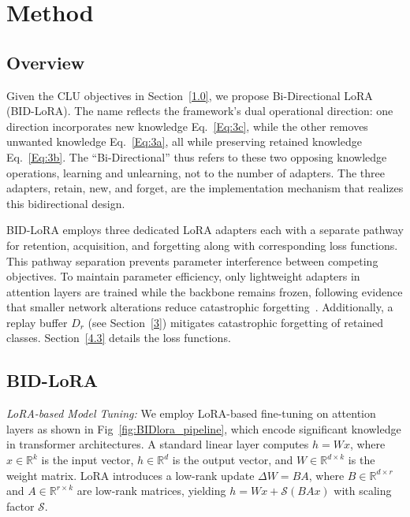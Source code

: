 \section{Method}
\label{4}
\subsection{Overview}
\label{4.1}

Given the CLU objectives in Section~\ref{1.0}, we propose Bi-Directional LoRA (BID-LoRA). The name reflects the framework's dual operational direction: one direction incorporates new knowledge Eq.~\ref{Eq:3c}, while the other removes unwanted knowledge Eq.~\ref{Eq:3a}, all while preserving retained knowledge Eq.~\ref{Eq:3b}. The ``Bi-Directional'' thus refers to these two opposing knowledge operations, learning and unlearning, not to the number of adapters. The three adapters, retain, new, and forget, are the implementation mechanism that realizes this bidirectional design.

BID-LoRA employs three dedicated LoRA adapters each with a separate pathway for retention, acquisition, and forgetting along with corresponding loss functions. This pathway separation prevents parameter interference between competing objectives. To maintain parameter efficiency, only lightweight adapters in attention layers are trained while the backbone remains frozen, following evidence that smaller network alterations reduce catastrophic forgetting~\cite{zhao2024continual}. Additionally, a replay buffer $D_r$ (see Section~\ref{3}) mitigates catastrophic forgetting of retained classes. Section~\ref{4.3} details the loss functions.

\subsection{BID-LoRA}
\label{4.2}

\medskip
\noindent
\textit{LoRA-based Model Tuning:}
We employ LoRA-based fine-tuning on attention layers as shown in Fig~\ref{fig:BIDlora_pipeline}, which encode significant knowledge in transformer architectures. A standard linear layer computes $h = Wx$, where $x \in \mathbb{R}^{k}$ is the input vector, $h \in \mathbb{R}^{d}$ is the output vector, and $W \in \mathbb{R}^{d \times k}$ is the weight matrix. LoRA introduces a low-rank update $\Delta W = BA$, where $B \in \mathbb{R}^{d \times r}$ and $A \in \mathbb{R}^{r \times k}$ are low-rank matrices, yielding $h = Wx + \mathcal{S}(BAx)$ with scaling factor $\mathcal{S}$.

